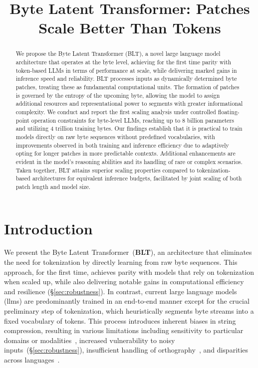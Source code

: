 \title{Byte Latent Transformer: Patches Scale Better Than Tokens}

\begin{abstract}
We propose the Byte Latent Transformer ({\textsc BLT}), a novel large language model architecture that operates at the byte level, achieving for the first time parity with token-based LLMs in terms of performance at scale, while delivering marked gains in inference speed and reliability. {\textsc BLT} processes inputs as dynamically determined byte patches, treating these as fundamental computational units. The formation of patches is governed by the entropy of the upcoming byte, allowing the model to assign additional resources and representational power to segments with greater informational complexity. We conduct and report the first scaling analysis under controlled floating-point operation constraints for byte-level LLMs, reaching up to 8 billion parameters and utilizing 4 trillion training bytes. Our findings establish that it is practical to train models directly on raw byte sequences without predefined vocabularies, with improvements observed in both training and inference efficiency due to adaptively opting for longer patches in more predictable contexts. Additional enhancements are evident in the model’s reasoning abilities and its handling of rare or complex scenarios. Taken together, {\textsc BLT} attains superior scaling properties compared to tokenization-based architectures for equivalent inference budgets, facilitated by joint scaling of both patch length and model size.
\end{abstract}

\section{Introduction}
\label{section:intro}

We present the Byte Latent Transformer~(\textbf{BLT}), an architecture that eliminates the need for tokenization by directly learning from raw byte sequences. This approach, for the first time, achieves parity with models that rely on tokenization when scaled up, while also delivering notable gains in computational efficiency and resilience (\S\ref{sec:robustness}). In contrast, current large language models (llms) are predominantly trained in an end-to-end manner except for the crucial preliminary step of tokenization, which heuristically segments byte streams into a fixed vocabulary of tokens. This process introduces inherent biases in string compression, resulting in various limitations including sensitivity to particular domains or modalities~\citep{dagangetting}, increased vulnerability to noisy inputs~(\S\ref{sec:robustness}), insufficient handling of orthography~\citep{edman2024cute}, and disparities across languages~\citep{liang2023xlm,petrov2024language,limisiewicz2024myte}.

